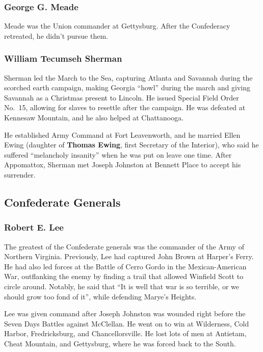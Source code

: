 \subsubsection*{George G. Meade}

Meade was the Union commander at Gettysburg.
After the Confederacy retreated, he didn't pursue them.

\subsubsection*{William Tecumseh Sherman}

Sherman led the March to the Sea, capturing Atlanta and Savannah during the scorched earth campaign,
making Georgia ``howl'' during the march and giving Savannah as a Christmas present to Lincoln.
He issued Special Field Order No.\ 15, allowing for slaves to resettle after the campaign.
He was defeated at Kennesaw Mountain, and he also helped at Chattanooga.

He established Army Command at Fort Leavenworth, and he married Ellen Ewing
(daughter of \textbf{Thomas Ewing}, first Secretary of the Interior),
who said he suffered ``melancholy insanity'' when he was put on leave one time.
After Appomattox, Sherman met Joseph Johnston at Bennett Place to accept his surrender.

\subsection*{Confederate Generals}

\subsubsection*{Robert E. Lee}

The greatest of the Confederate generals was the commander of the Army of Northern Virginia.
Previously, Lee had captured John Brown at Harper's Ferry.
He had also led forces at the Battle of Cerro Gordo in the Mexican-American War,
outflanking the enemy by finding a trail that allowed Winfield Scott to circle around.
Notably, he said that ``It is well that war is so terrible, or we should grow too fond of it'',
while defending Marye's Heights.

Lee was given command after Joseph Johnston was wounded right before the Seven Days Battles against McClellan.
He went on to win at Wilderness, Cold Harbor, Fredricksburg, and Chancellorsville.
He lost lots of men at Antietam, Cheat Mountain, and Gettysburg, where he was forced back to the South.

